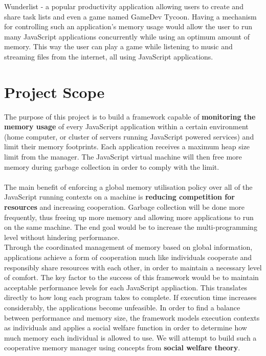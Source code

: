 \documentclass{l4proj}
\begin{document}
Wunderlist - a popular productivity application allowing users to create and share task lists\cite{wunderlist} and even a game named GameDev Tycoon\cite{tycoongame}. 
Having a mechanism for controlling such an application's memory usage would allow the user to run many JavaScript applications concurrently while using an optimum amount of memory. This way the user can play a game while listening to music and streaming files from the internet, all using JavaScript applications.
\section{Project Scope}
\hspace*{3em} The purpose of this project is to build a framework capable of \textbf{monitoring the memory usage} of every JavaScript application within a certain environment (home computer, or cluster of servers running JavaScript powered services) and limit their memory footprints. Each application receives a maximum heap size limit from the manager. The JavaScript virtual machine will then free more memory during garbage collection in order to comply with the limit.
\\\\ %
\hspace*{3em} The main benefit of enforcing a global memory utilisation policy over all of the JavaScript running contexts on a machine is \textbf{reducing competition for resources} and increasing cooperation. Garbage collection will be done more frequently, thus freeing up more memory and allowing more applications to run on the same machine. The end goal would be to increase the multi-programming level without hindering performance.\\
\hspace*{3em} Through the coordinated management of memory based on global information, applications achieve a form of cooperation much like individuals cooperate and responsibly share resources with each other, in order to maintain a necessary level of comfort. The key factor to the success of this framework would be to maintain acceptable performance levels for each JavaScript appliaction. This translates directly to how long each program takes to complete. If execution time increases considerably, the applications become unfeasible. In order to find a balance between performance and memory size, the framework models execution contexts as individuals and applies a social welfare function in order to determine how much memory each individual is allowed to use. We will attempt to build such a cooperative memory manager using concepts from \textbf{social welfare theory}.
\end{document}
